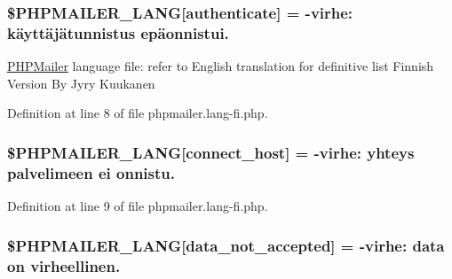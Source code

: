 \subsubsection[{\texorpdfstring{\$\+P\+H\+P\+M\+A\+I\+L\+E\+R\+\_\+\+L\+A\+NG}{$PHPMAILER_LANG}}]{\setlength{\rightskip}{0pt plus 5cm}\$P\+H\+P\+M\+A\+I\+L\+E\+R\+\_\+\+L\+A\+NG\mbox{[}\textquotesingle{}authenticate\textquotesingle{}\mbox{]} = -\/virhe\+: käyttäjätunnistus epäonnistui.\textquotesingle{}}\hypertarget{phpmailer_8lang-fi_8php_a2cb33073c989b85580748e331ed8b4aa}{}\label{phpmailer_8lang-fi_8php_a2cb33073c989b85580748e331ed8b4aa}
\hyperlink{class_p_h_p_mailer}{P\+H\+P\+Mailer} language file\+: refer to English translation for definitive list Finnish Version By Jyry Kuukanen 

Definition at line 8 of file phpmailer.\+lang-\/fi.\+php.

\subsubsection[{\texorpdfstring{\$\+P\+H\+P\+M\+A\+I\+L\+E\+R\+\_\+\+L\+A\+NG}{$PHPMAILER_LANG}}]{\setlength{\rightskip}{0pt plus 5cm}\$P\+H\+P\+M\+A\+I\+L\+E\+R\+\_\+\+L\+A\+NG\mbox{[}\textquotesingle{}connect\+\_\+host\textquotesingle{}\mbox{]} = -\/virhe\+: yhteys palvelimeen ei onnistu.\textquotesingle{}}\hypertarget{phpmailer_8lang-fi_8php_a2ee0cc637a06b96e45600db31c6799ee}{}\label{phpmailer_8lang-fi_8php_a2ee0cc637a06b96e45600db31c6799ee}


Definition at line 9 of file phpmailer.\+lang-\/fi.\+php.

\subsubsection[{\texorpdfstring{\$\+P\+H\+P\+M\+A\+I\+L\+E\+R\+\_\+\+L\+A\+NG}{$PHPMAILER_LANG}}]{\setlength{\rightskip}{0pt plus 5cm}\$P\+H\+P\+M\+A\+I\+L\+E\+R\+\_\+\+L\+A\+NG\mbox{[}\textquotesingle{}data\+\_\+not\+\_\+accepted\textquotesingle{}\mbox{]} = -\/virhe\+: {\bf data} {\bf on} virheellinen.\textquotesingle{}}\hypertarget{phpmailer_8lang-fi_8php_a814c6b191205d2361b3233e9c9d6fda5}{}\label{phpmailer_8lang-fi_8php_a814c6b191205d2361b3233e9c9d6fda5}


